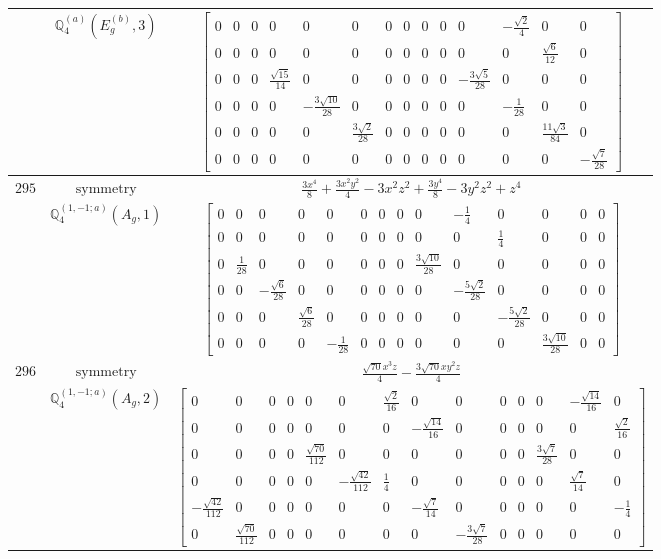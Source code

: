 \documentclass[fleqn,8pt,landscape]{jsarticle}
\begin{document}
\begin{longtable}{ccc}
$  $ & $ \mathbb{Q}_{4}^{(a)}(E_{g}^{(b)},3) $ & $ \begin{bmatrix} 0 & 0 & 0 & 0 & 0 & 0 & 0 & 0 & 0 & 0 & 0 & - \frac{\sqrt{2}}{4} & 0 & 0 \\ 0 & 0 & 0 & 0 & 0 & 0 & 0 & 0 & 0 & 0 & 0 & 0 & \frac{\sqrt{6}}{12} & 0 \\ 0 & 0 & 0 & \frac{\sqrt{15}}{14} & 0 & 0 & 0 & 0 & 0 & 0 & - \frac{3 \sqrt{5}}{28} & 0 & 0 & 0 \\ 0 & 0 & 0 & 0 & - \frac{3 \sqrt{10}}{28} & 0 & 0 & 0 & 0 & 0 & 0 & - \frac{1}{28} & 0 & 0 \\ 0 & 0 & 0 & 0 & 0 & \frac{3 \sqrt{2}}{28} & 0 & 0 & 0 & 0 & 0 & 0 & \frac{11 \sqrt{3}}{84} & 0 \\ 0 & 0 & 0 & 0 & 0 & 0 & 0 & 0 & 0 & 0 & 0 & 0 & 0 & - \frac{\sqrt{7}}{28} \end{bmatrix} $ \\ \hline
$ 295 $ & $ \text{symmetry} $ & $ \frac{3 x^{4}}{8} + \frac{3 x^{2} y^{2}}{4} - 3 x^{2} z^{2} + \frac{3 y^{4}}{8} - 3 y^{2} z^{2} + z^{4} $ \\
$  $ & $ \mathbb{Q}_{4}^{(1,-1;a)}(A_{g},1) $ & $ \begin{bmatrix} 0 & 0 & 0 & 0 & 0 & 0 & 0 & 0 & 0 & - \frac{1}{4} & 0 & 0 & 0 & 0 \\ 0 & 0 & 0 & 0 & 0 & 0 & 0 & 0 & 0 & 0 & \frac{1}{4} & 0 & 0 & 0 \\ 0 & \frac{1}{28} & 0 & 0 & 0 & 0 & 0 & 0 & \frac{3 \sqrt{10}}{28} & 0 & 0 & 0 & 0 & 0 \\ 0 & 0 & - \frac{\sqrt{6}}{28} & 0 & 0 & 0 & 0 & 0 & 0 & - \frac{5 \sqrt{2}}{28} & 0 & 0 & 0 & 0 \\ 0 & 0 & 0 & \frac{\sqrt{6}}{28} & 0 & 0 & 0 & 0 & 0 & 0 & - \frac{5 \sqrt{2}}{28} & 0 & 0 & 0 \\ 0 & 0 & 0 & 0 & - \frac{1}{28} & 0 & 0 & 0 & 0 & 0 & 0 & \frac{3 \sqrt{10}}{28} & 0 & 0 \end{bmatrix} $ \\ \hline
$ 296 $ & $ \text{symmetry} $ & $ \frac{\sqrt{70} x^{3} z}{4} - \frac{3 \sqrt{70} x y^{2} z}{4} $ \\
$  $ & $ \mathbb{Q}_{4}^{(1,-1;a)}(A_{g},2) $ & $ \begin{bmatrix} 0 & 0 & 0 & 0 & 0 & 0 & \frac{\sqrt{2}}{16} & 0 & 0 & 0 & 0 & 0 & - \frac{\sqrt{14}}{16} & 0 \\ 0 & 0 & 0 & 0 & 0 & 0 & 0 & - \frac{\sqrt{14}}{16} & 0 & 0 & 0 & 0 & 0 & \frac{\sqrt{2}}{16} \\ 0 & 0 & 0 & 0 & \frac{\sqrt{70}}{112} & 0 & 0 & 0 & 0 & 0 & 0 & \frac{3 \sqrt{7}}{28} & 0 & 0 \\ 0 & 0 & 0 & 0 & 0 & - \frac{\sqrt{42}}{112} & \frac{1}{4} & 0 & 0 & 0 & 0 & 0 & \frac{\sqrt{7}}{14} & 0 \\ - \frac{\sqrt{42}}{112} & 0 & 0 & 0 & 0 & 0 & 0 & - \frac{\sqrt{7}}{14} & 0 & 0 & 0 & 0 & 0 & - \frac{1}{4} \\ 0 & \frac{\sqrt{70}}{112} & 0 & 0 & 0 & 0 & 0 & 0 & - \frac{3 \sqrt{7}}{28} & 0 & 0 & 0 & 0 & 0 \end{bmatrix} $ \\ \hline

\end{longtable}
\end{document}

